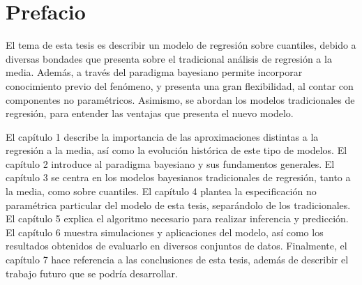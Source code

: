 \documentclass[letterpaper,onside,11pt,review,usenames,dvipsnames]{report}
\begin{document}
\pagestyle{plain}
\chapter*{Prefacio}


El tema de esta tesis es describir un modelo de regresi\'on sobre cuantiles, debido a diversas bondades que presenta sobre el tradicional an\'alisis de regresi\'on a la media. Adem\'as, a través del paradigma bayesiano permite incorporar conocimiento previo del fen\'omeno, y presenta una gran flexibilidad, al contar con componentes no param\'etricos. Asimismo, se abordan los modelos tradicionales de regresi\'on, para entender las ventajas que presenta el nuevo modelo.

El cap\'itulo 1 describe la importancia de las aproximaciones distintas a la regresi\'on a la media, así como la evoluci\'on hist\'orica de este tipo de modelos. El cap\'itulo 2 introduce al paradigma bayesiano y sus fundamentos generales. El cap\'itulo 3 se centra en los modelos bayesianos tradicionales de regresi\'on, tanto a la media, como sobre cuantiles. El cap\'itulo 4 plantea la especificaci\'on no param\'etrica particular del modelo de esta tesis, separ\'andolo de los tradicionales. El cap\'itulo 5 explica el algoritmo necesario para realizar inferencia y predicci\'on. El cap\'itulo 6 muestra simulaciones y aplicaciones del modelo, as\'i como los resultados obtenidos de evaluarlo en diversos conjuntos de datos. Finalmente, el cap\'itulo 7 hace referencia a las conclusiones de esta tesis, adem\'as de describir el trabajo futuro que se podr\'ia desarrollar.




\renewcommand{\baselinestretch}{0.75}\normalsize
\tableofcontents
\renewcommand{\baselinestretch}{1.0}\normalsize

\end{document}
